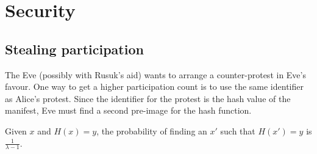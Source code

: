 \mode*

\section{Security}

\subsection{Stealing participation}

The Eve (possibly with Rusuk's aid) wants to arrange a counter-protest in Eve's 
favour.
One way to get a higher participation count is to use the same identifier as 
Alice's protest.
Since the identifier for the protest is the hash value of the manifest, Eve 
must find a second pre-image for the hash function.


\begin{proposition}
  Given \(x\) and \(H(x) = y\), the probability of finding an \(x'\) such that 
  \(H(x') = y\) is \(\frac{1}{\lambda-1}\).
\end{proposition}
